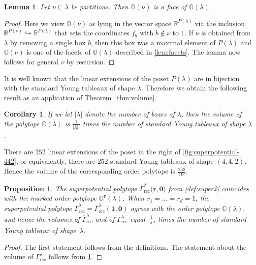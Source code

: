\documentclass{amsart}
\newtheorem{corollary}[thm]{Corollary}
\newtheorem{lemma}[thm]{Lemma}
\newtheorem{proposition}[thm]{Proposition}
\theoremstyle{definition}
\numberwithin{equation}{section}
\newcommand{\R}{\mathbb R}
\newcommand{\Q}{\Gamma}
\newcommand{\rect}{\mathrm{rec}}
\newcommand{\OO}{\mathbb{O}}
\newcommand{\rGamma}{\overline{\Gamma}}
\begin{document}
\begin{lemma}\label{lem:faces}
Let $\nu \subseteq \lambda$ be partitions.
Then $\OO(\nu)$ is a face of 
$\OO(\lambda)$.
\end{lemma}
\begin{proof}
Here we view $\OO(\nu)$ as lying in the vector space $\R^{P(\lambda)}$ via the inclusion $\R^{P(\nu)}\hookrightarrow \R^{P(\lambda)}$	 that sets the coordinates $f_b$ with $b\notin \nu$ to $1$. If $\nu$ is obtained from $\lambda$ by removing a single box $b$, then this box was a maximal element of $P(\lambda)$ and $\OO(\nu)$ is one of the facets of $\OO(\lambda)$ described in \cref{lem:facets}. The lemma now follows for general $\nu$ by recursion.   
\end{proof}

It is well known that the linear extensions of the poset $P(\lambda)$
are in bijection with the standard Young tableaux of shape $\lambda$.
Therefore we obtain the following result as an application of Theorem~\ref{thm:volume}.
\begin{corollary}\label{cor:volume}
If we let $|\lambda|$ denote
the number of boxes of $\lambda$, then the volume of the polytope $\OO(\lambda)$
is $\frac{1}{|\lambda|!}$ times the 
number of standard Young tableaux of 
shape $\lambda$.
\end{corollary}
There are $252$ linear extensions 
of the poset 
in the right of 
\cref{fig:superpotential-442}, or equivalently, there
are $252$ standard Young tableaux of shape $(4,4,2)$.
Hence
the volume of the corresponding order polytope 
is $\frac{252}{10!}$.  










\begin{proposition}\label{p:unimodular2} 
The superpotential 
	polytope $\rGamma^{\lambda}_{{\rect}}({\mathbf{r},\mathbf{0})}$
 from \cref{def:super2}	coincides with the marked order polytope 
$\OO^{\mathbf{r}}(\lambda)$.
	When 
	$r_1=\dots=r_d=1$, 
	 the superpotential polytope $\rGamma^{\lambda}_{{\rect}} = 
	 \rGamma^{\lambda}_{{\rect}}(\mathbf{1},\mathbf {0})$ agrees with
	 the order polytope $\OO(\lambda)$, and hence 
	the volumes of 
	 $\rGamma^{\lambda}_{{\rect}}$ and of
	 $\Gamma^{\lambda}_{{\rect}}$
	 equal $\frac{1}{|\lambda|!}$ times the number
	 of standard Young tableaux of shape~$\lambda$.
\end{proposition}


	\begin{proof}
The first statement follows
from the definitions.
The statement about the volume of $\Q^{\lambda}_{{\rect}}$ follows from 
 \cref{cor:volume}.
\end{proof}
\end{document}
